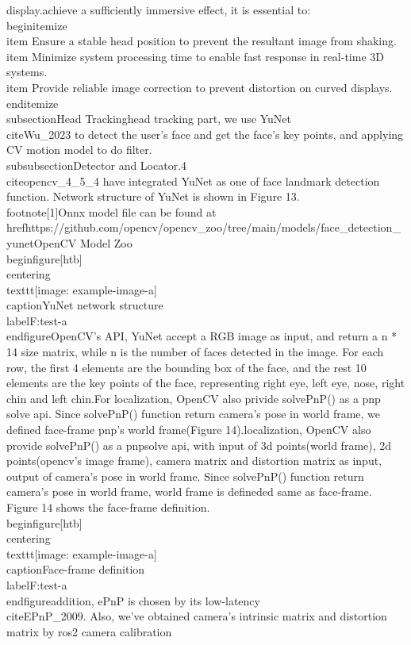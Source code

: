 display.\n\nTo achieve a sufficiently immersive effect, it is essential to:\n\\begin{itemize}\n    \\item Ensure a stable head position to prevent the resultant image from shaking.\n    \\item Minimize system processing time to enable fast response in real-time 3D systems.\n    \\item Provide reliable image correction to prevent distortion on curved displays.\n\\end{itemize}\n\n\\subsection{Head Tracking}\nIn head tracking part, we use YuNet\\cite{Wu_2023} to detect the user's face and get the face's key points, and applying CV motion model to do filter.\n\n\\subsubsection{Detector and Locator}.4\\cite{opencv_4_5_4} have integrated YuNet as one of face landmark detection function. Network structure of YuNet is shown in Figure 13. \\footnote[1]{Onnx model file can be found at \\href{https://github.com/opencv/opencv_zoo/tree/main/models/face_detection_yunet}{OpenCV Model Zoo}}\n\n\\begin{figure}[htb]\n    \\centering\n    \\texttt{[image: example-image-a]}\n    \\caption{YuNet network structure}\\label{F:test-a}\n\\end{figure}\n\nIn OpenCV's API, YuNet accept a RGB image as input, and return a n * 14 size matrix, while n is the number of faces detected in the image. For each row, the first 4 elements are the bounding box of the face, and the rest 10 elements are the key points of the face, representing right eye, left eye, nose, right chin and left chin.\n\n For localization, OpenCV also privide solvePnP() as a pnp solve api. Since solvePnP() function return camera's pose in world frame, we defined face-frame pnp's world frame(Figure 14).\n\n\n\nFor localization, OpenCV also provide solvePnP() as a pnp\n solve api, with input of 3d points(world frame), 2d points(opencv's image frame), camera matrix and distortion matrix as input, output of camera's pose in world frame. Since solvePnP() function return camera's pose in world frame, world frame is defineded same as face-frame. Figure 14 shows the face-frame definition.\n\n\\begin{figure}[htb]\n    \\centering\n    \\texttt{[image: example-image-a]}\n    \\caption{Face-frame definition}\\label{F:test-a}\n\\end{figure}\n\nIn addition, ePnP is chosen by its low-latency\\cite{EPnP_2009}. Also, we've obtained camera's intrinsic matrix and distortion matrix by ros2 camera calibration 
